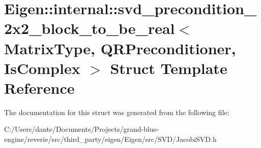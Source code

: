 \hypertarget{struct_eigen_1_1internal_1_1svd__precondition__2x2__block__to__be__real}{}\section{Eigen\+::internal\+::svd\+\_\+precondition\+\_\+2x2\+\_\+block\+\_\+to\+\_\+be\+\_\+real$<$ Matrix\+Type, Q\+R\+Preconditioner, Is\+Complex $>$ Struct Template Reference}
\label{struct_eigen_1_1internal_1_1svd__precondition__2x2__block__to__be__real}


The documentation for this struct was generated from the following file\+:\begin{DoxyCompactItemize}
\item 
C\+:/\+Users/dante/\+Documents/\+Projects/grand-\/blue-\/engine/reverie/src/third\+\_\+party/eigen/\+Eigen/src/\+S\+V\+D/Jacobi\+S\+V\+D.\+h\end{DoxyCompactItemize}

